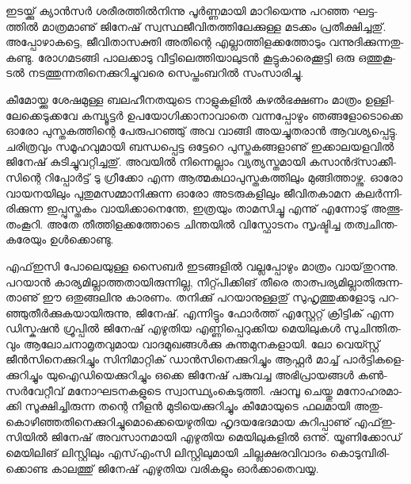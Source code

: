 ഇ­ട­യ്ക്കു് ക്യാന്‍­സര്‍ ശരീ­ര­ത്തില്‍­നി­ന്നു പൂര്‍­ണ്ണ­മാ­യി മാ­റി­യെ­ന്നു പറ­ഞ്ഞ ഘട്ട­ത്തില്‍ മാ­ത്ര­മാ­ണു് ജി­നേ­ഷ് 
സ്വ­സ്ഥ­ജീ­വി­ത­ത്തി­ലേ­ക്കു­ള്ള മട­ക്കം പ്ര­തീ­ക്ഷി­ച്ച­തു്. അപ്പോ­ഴാ­ക­ട്ടെ, ജീ­വി­താ­സ­ക്തി അതി­ന്റെ എല്ലാ­ത്തി­ള­ക്ക­ത്തോ­ടും 
വന്നു­ദി­ക്കു­ന്ന­തു­ക­ണ്ടു. രോ­ഗ­മ­ട­ങ്ങി പാ­ല­ക്കാ­ടു വീ­ട്ടി­ലെ­ത്തി­യാ­ലു­ടന്‍ കൂ­ട്ടു­കാ­രെ­ക്കൂ­ട്ടി ഒരു ഒത്തു­കൂ­ടല്‍ നട­ത്തു­ന്ന­തി­നെ­ക്കു­റി­ച്ചു­വ­രെ 
സെ­പ്തം­ബ­റില്‍ സം­സാ­രി­ച്ചു­.

­കീ­മോ­യ്ക്കു ശേ­ഷ­മു­ള്ള ബല­ഹീ­ന­ത­യു­ടെ നാ­ളു­ക­ളില്‍ കു­ഴല്‍­ഭ­ക്ഷ­ണം മാ­ത്രം ഉള്ളി­ലേ­ക്കെ­ടു­ക്ക­വേ കമ്പ്യൂ­ട്ടര്‍ ഉപ­യോ­ഗി­ക്കാ­നാ­വാ­തെ 
വന്ന­പ്പോ­ഴും ഞങ്ങ­ളോ­ടൊ­ക്കെ ഓരോ പു­സ്ത­ക­ത്തി­ന്റെ പേ­രു­പ­റ­ഞ്ഞു് അവ വാ­ങ്ങി അയ­ച്ചു­ത­രാന്‍ ആവ­ശ്യ­പ്പെ­ട്ടു. ചരി­ത്ര­വും 
സമൂ­ഹ­വു­മാ­യി ബന്ധ­പ്പെ­ട്ട ഒട്ടേ­റെ പു­സ്ത­ക­ങ്ങ­ളാ­ണു് ഇക്കാ­ല­യ­ള­വില്‍ ജി­നേ­ഷ് കു­ടി­ച്ചു­വ­റ്റി­ച്ച­തു്. അവ­യില്‍ നി­ന്നെ­ല്ലാം 
വ്യ­ത്യ­സ്ത­മാ­യി കസാന്‍­ദ്സാ­ക്കീ­സി­ന്റെ റി­പ്പോര്‍­ട്ട് ടു ഗ്രീ­ക്കോ എന്ന ആത്മ­ക­ഥാ­പു­സ്ത­ക­ത്തി­ലും മു­ങ്ങി­ത്താ­ഴ്ന്നു. ഓരോ വാ­യ­ന­യി­ലും 
പു­തു­മ­സ­മ്മാ­നി­ക്കു­ന്ന ഓരോ അട­രു­ക­ളി­ലും ജീ­വി­ത­കാ­മന കലര്‍­ന്നി­രി­ക്കു­ന്ന ഇപ്പു­സ്ത­കം വാ­യി­ക്കാ­നെ­ന്തേ, ഇത്ര­യും താ­മ­സി­ച്ചൂ 
എന്നു് എന്നോ­ടു് അത്ഭു­തം­കൂ­റി­.   അതേ തീ­ത്തി­ള­ക്ക­ത്തോ­ടെ ചി­ന്ത­യില്‍ വി­സ്ഫോ­ട­നം സൃ­ഷ്ടി­ച്ച തത്വ­ചി­ന്ത­ക­രേ­യും ഉള്‍­ക്കൊ­ണ്ടു­.

എഫ്ഇ­സി പോ­ലെ­യു­ള്ള സൈ­ബര്‍ ഇട­ങ്ങ­ളില്‍ വല്ല­പ്പോ­ഴും മാ­ത്രം വാ­യ്‌­തു­റ­ന്നു. പറ­യാന്‍ കാ­ര്യ­മി­ല്ലാ­ത്ത­താ­യി­രു­ന്നി­ല്ല, 
നി­റ്റ്പി­ക്കി­ങ് തീ­രെ താ­ത്പ­ര്യ­മി­ല്ലാ­തി­രു­ന്ന­താ­ണു് ഈ ഒതു­ങ്ങ­ലി­നു കാ­ര­ണം. തനി­ക്കു് പറ­യാ­നു­ള്ള­തു് സു­ഹൃ­ത്തു­ക്ക­ളോ­ടു 
പറ­ഞ്ഞു­തീര്‍­ക്കു­ക­യാ­യി­രു­ന്നു, ജി­നേ­ഷ്. എന്നി­ട്ടും ഫോര്‍­ത്ത് എസ്റ്റേ­റ്റ് ക്രി­ട്ടി­ക്‍ എന്ന ഡി­സ്ക­ഷന്‍ ഗ്രൂ­പ്പില്‍ ജി­നേ­ഷ് എഴു­തിയ 
എണ്ണി­പ്പെ­റു­ക്കിയ മെ­യി­ലു­കള്‍ സു­ചി­ന്തി­ത­വും ആലോ­ച­നാ­മൃ­ത­വു­മായ വാ­ദ­മു­ഖ­ങ്ങള്‍­ക്കു കു­ന്ത­മു­ന­ക­ളാ­യി. ലോ വെ­യ്സ്റ്റ് 
ജീന്‍­സി­നെ­ക്കു­റി­ച്ചും സി­നി­മാ­റ്റി­ക്‍ ഡാന്‍­സി­നെ­ക്കു­റി­ച്ചും ആഫ്റ്റര്‍ മാ­ച്ച് പാര്‍­ട്ടി­ക­ളെ­ക്കു­റി­ച്ചും യു­ഐ­ഡി­യെ­ക്കു­റി­ച്ചും ഒക്കെ 
ജി­നേ­ഷ് പങ്കു­വ­ച്ച അഭി­പ്രാ­യ­ങ്ങള്‍ കണ്‍­സര്‍­വേ­റ്റീ­വ് മനോ­ഘ­ട­ന­ക­ളു­ടെ സ്വാ­സ്ഥ്യം­കെ­ടു­ത്തി. ഷാ­മ്പൂ ചെ­യ്തു മനോ­ഹ­ര­മാ­ക്കി 
സൂ­ക്ഷി­ച്ചി­രു­ന്ന തന്റെ നീ­ളന്‍ മു­ടി­യെ­ക്കു­റി­ച്ചും കീ­മോ­യു­ടെ ഫല­മാ­യി അതു­കൊ­ഴി­ഞ്ഞ­തി­നെ­ക്കു­റി­ച്ചു­മൊ­ക്കെ­യെ­ഴു­തിയ 
ഹൃ­ദ­യ­ഭേ­ദ­മായ കു­റി­പ്പാ­ണു് എഫ്ഇ­സി­യില്‍ ജി­നേ­ഷ് അവ­സാ­ന­മാ­യി എഴു­തിയ മെ­യി­ലു­ക­ളില്‍ ഒന്നു്. യൂ­ണി­ക്കോ­ഡ് 
മെ­യി­ലി­ങ് ലി­സ്റ്റി­ലും എസ്എം­സി ലി­സ്റ്റി­ലു­മാ­യി ചി­ല്ല­ക്ഷ­ര­വി­വാ­ദം കൊ­ടു­മ്പി­രി­ക്കൊ­ണ്ട കാ­ല­ത്തു് ജി­നേ­ഷ് എഴു­തിയ വരി­ക­ളും 
ഓര്‍­ക്കാ­തെ­വ­യ്യ.

